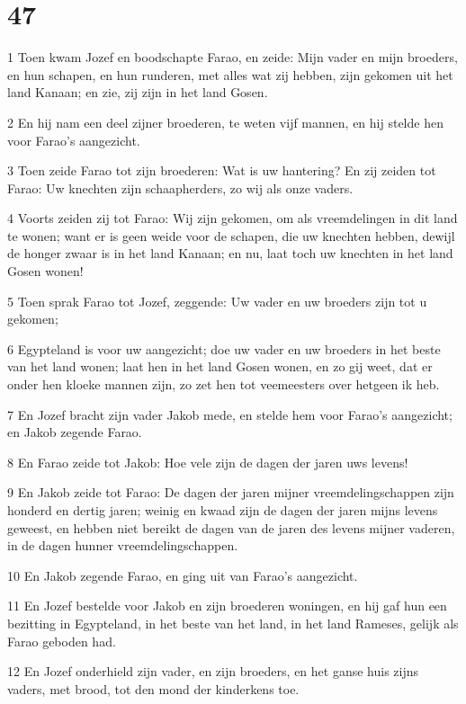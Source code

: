 \chapter{47}

\par 1 Toen kwam Jozef en boodschapte Farao, en zeide: Mijn vader en mijn broeders, en hun schapen, en hun runderen, met alles wat zij hebben, zijn gekomen uit het land Kanaan; en zie, zij zijn in het land Gosen.
\par 2 En hij nam een deel zijner broederen, te weten vijf mannen, en hij stelde hen voor Farao's aangezicht.
\par 3 Toen zeide Farao tot zijn broederen: Wat is uw hantering? En zij zeiden tot Farao: Uw knechten zijn schaapherders, zo wij als onze vaders.
\par 4 Voorts zeiden zij tot Farao: Wij zijn gekomen, om als vreemdelingen in dit land te wonen; want er is geen weide voor de schapen, die uw knechten hebben, dewijl de honger zwaar is in het land Kanaan; en nu, laat toch uw knechten in het land Gosen wonen!
\par 5 Toen sprak Farao tot Jozef, zeggende: Uw vader en uw broeders zijn tot u gekomen;
\par 6 Egypteland is voor uw aangezicht; doe uw vader en uw broeders in het beste van het land wonen; laat hen in het land Gosen wonen, en zo gij weet, dat er onder hen kloeke mannen zijn, zo zet hen tot veemeesters over hetgeen ik heb.
\par 7 En Jozef bracht zijn vader Jakob mede, en stelde hem voor Farao's aangezicht; en Jakob zegende Farao.
\par 8 En Farao zeide tot Jakob: Hoe vele zijn de dagen der jaren uws levens!
\par 9 En Jakob zeide tot Farao: De dagen der jaren mijner vreemdelingschappen zijn honderd en dertig jaren; weinig en kwaad zijn de dagen der jaren mijns levens geweest, en hebben niet bereikt de dagen van de jaren des levens mijner vaderen, in de dagen hunner vreemdelingschappen.
\par 10 En Jakob zegende Farao, en ging uit van Farao's aangezicht.
\par 11 En Jozef bestelde voor Jakob en zijn broederen woningen, en hij gaf hun een bezitting in Egypteland, in het beste van het land, in het land Rameses, gelijk als Farao geboden had.
\par 12 En Jozef onderhield zijn vader, en zijn broeders, en het ganse huis zijns vaders, met brood, tot den mond der kinderkens toe.
